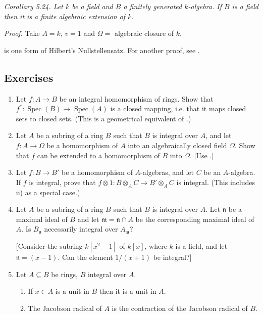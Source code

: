 \noindent\textit{Corollary 5.24. Let $k$ be a field and $B$ a finitely generated $k$-algebra. If $B$ is a field then it is a finite algebraic extension of $k$.}

\noindent\textit{Proof.} Take $A=k$, $v=1$ and $\Omega={}$ algebraic closure of $k$. \proofbox

 is one form of Hilbert's Nullstellensatz. For another proof, see .

\subsection{Exercises}

\begin{enumerate}
\item Let $f:A\longrightarrow B$ be an integral homomorphism of rings. Show that $f^*:\operatorname{Spec}(B)\longrightarrow\operatorname{Spec}(A)$ is a closed mapping, i.e. that it maps closed sets to closed sets. (This is a geometrical equivalent of .)

\item Let $A$ be a subring of a ring $B$ such that $B$ is integral over $A$, and let $f:A\longrightarrow\Omega$ be a homomorphism of $A$ into an algebraically closed field $\Omega$. Show that $f$ can be extended to a homomorphism of $B$ into $\Omega$. [Use .]

\item Let $f:B\longrightarrow B'$ be a homomorphism of $A$-algebras, and let $C$ be an $A$-algebra. If $f$ is integral, prove that $f\otimes1:B\otimes_A C\longrightarrow B'\otimes_A C$ is integral. (This includes  ii) as a special case.)

\item Let $A$ be a subring of a ring $B$ such that $B$ is integral over $A$. Let $\mathfrak n$ be a maximal ideal of $B$ and let $\mathfrak m=\mathfrak n\cap A$ be the corresponding maximal ideal of $A$. Is $B_{\mathfrak n}$ necessarily integral over $A_{\mathfrak m}$?

[Consider the subring $k[x^2-1]$ of $k[x]$, where $k$ is a field, and let $\mathfrak n=(x-1)$. Can the element $1/(x+1)$ be integral?]

\item Let $A\subseteq B$ be rings, $B$ integral over $A$.
\begin{enumerate}
\renewcommand{\labelenumii}{\roman{enumii})}
\item If $x\in A$ is a unit in $B$ then it is a unit in $A$.
\item The Jacobson radical of $A$ is the contraction of the Jacobson radical of $B$.
\end{enumerate}


\end{enumerate}
